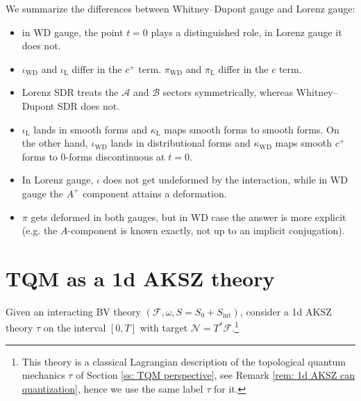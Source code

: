 \documentclass{amsart}
\theoremstyle{plain} %
\theoremstyle{definition}
\theoremstyle{remark}
\newcommand{\mc}{\mathcal}
\newcommand{\mr}{\mathrm}
\newcommand{\ra}{\rightarrow}
\newcommand{\F}{\mathcal{F}}
\newcommand{\ii}{\mathrm{int}}
\newcommand{\cl}{\mathrm{cl}}
\newcommand{\A}{\mathcal{A}}
\newcommand{\B}{\mathcal{B}}
\newcommand{\N}{\mathcal{N}}
\begin{document}
We summarize the differences between Whitney--Dupont gauge and Lorenz gauge:
\begin{itemize}
    \item in WD gauge, the point $t=0$ plays a distinguished role, in Lorenz gauge it does not.
    \item $\iota_\mr{WD}$ and $\iota_\mr{L}$ differ in the $c^+$ term. $\pi_\mr{WD}$ and $\pi_\mr{L}$ differ in the $c$ term.
    \item Lorenz SDR treats the $\A$ and $\B$ sectors symmetrically, whereas Whitney--Dupont SDR does not.
    \item $\iota_\mr{L}$ lands in smooth forms and $\kappa_\mr{L}$ maps smooth forms to smooth forms. On the other hand, $\iota_\mr{WD}$ lands in distributional forms and $\kappa_\mr{WD}$ maps smooth $c^+$ forms to 0-forms discontinuous at $t=0$.
    \item In Lorenz gauge, $\iota$ does not get undeformed by the interaction, while in WD gauge the $A^+$ component attains a deformation.
    \item $\pi$ gets deformed in both gauges, but in WD case the answer is more explicit (e.g. the $A$-component is known exactly, not up to an implicit conjugation).
\end{itemize}



\section{TQM as a 1d AKSZ theory}
\label{ss: TQM as 1d AKSZ}

Given an interacting BV theory $(\F,\omega,S=S_0+S_\ii)$, consider a 1d AKSZ theory $\tau$ on the interval $%
[0,T]$ with target $\N=T^*\F$.\footnote{This theory is a classical Lagrangian description of the topological quantum mechanics $\tau$ of Section \ref{ss: TQM perspective}, see Remark \ref{rem: 1d AKSZ can quantization}, hence we use the same label $\tau$ for it.}
\end{document}
